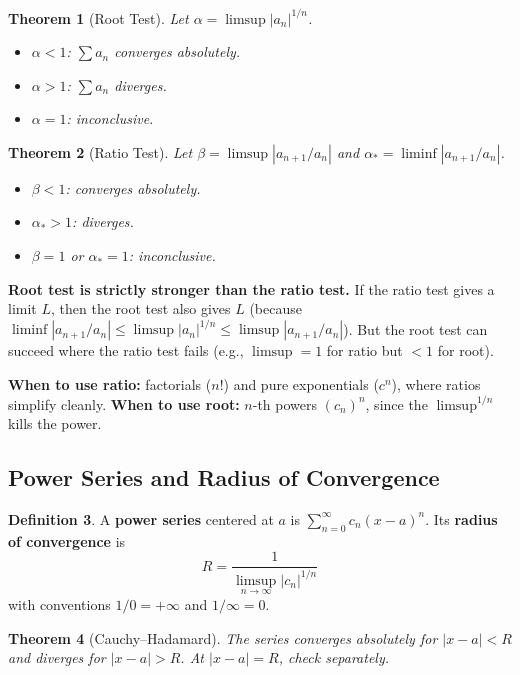 \documentclass[11pt]{article}
\theoremstyle{myplain}
\newtheorem{theorem}{Theorem}[section]
\theoremstyle{definition}
\newtheorem{definition}[theorem]{Definition}
\theoremstyle{remark}
\begin{document}
\begin{theorem}[Root Test]
Let $\alpha = \limsup |a_n|^{1/n}$.
\begin{itemize}
  \item $\alpha < 1$: $\sum a_n$ converges absolutely.
  \item $\alpha > 1$: $\sum a_n$ diverges.
  \item $\alpha = 1$: inconclusive.
\end{itemize}
\end{theorem}

\begin{theorem}[Ratio Test]
Let $\beta = \limsup |a_{n+1}/a_n|$ and $\alpha_* = \liminf |a_{n+1}/a_n|$.
\begin{itemize}
  \item $\beta < 1$: converges absolutely.
  \item $\alpha_* > 1$: diverges.
  \item $\beta = 1$ or $\alpha_* = 1$: inconclusive.
\end{itemize}
\end{theorem}

\begin{insight}
\textbf{Root test is strictly stronger than the ratio test.} If the ratio test gives a limit $L$, then the root test also gives $L$ (because $\liminf |a_{n+1}/a_n| \leq \limsup |a_n|^{1/n} \leq \limsup |a_{n+1}/a_n|$). But the root test can succeed where the ratio test fails (e.g., $\limsup = 1$ for ratio but $< 1$ for root).

\textbf{When to use ratio:} factorials ($n!$) and pure exponentials ($c^n$), where ratios simplify cleanly. \textbf{When to use root:} $n$-th powers $(c_n)^n$, since the $\limsup^{1/n}$ kills the power.
\end{insight}

\subsection{Power Series and Radius of Convergence}

\begin{definition}
A \textbf{power series} centered at $a$ is $\sum_{n=0}^\infty c_n(x-a)^n$. Its \textbf{radius of convergence} is
$$R = \frac{1}{\limsup_{n\to\infty} |c_n|^{1/n}}$$
with conventions $1/0 = +\infty$ and $1/\infty = 0$.
\end{definition}

\begin{theorem}[Cauchy--Hadamard]
The series converges absolutely for $|x - a| < R$ and diverges for $|x - a| > R$. At $|x - a| = R$, check separately.
\end{theorem}
\end{document}
